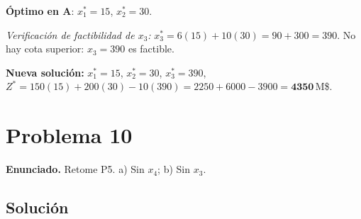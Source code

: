 \documentclass{article}
\begin{document}
\textbf{Óptimo en A}: $x_1^*=15$, $x_2^*=30$.

\textit{Verificación de factibilidad de $x_3$:} $x_3^*=6(15)+10(30)=90+300=390$. No hay cota superior: $x_3=390$ es factible. \checkmark

\textbf{Nueva solución:} $x_1^*=15$, $x_2^*=30$, $x_3^*=390$, $Z^*=150(15)+200(30)-10(390)=2250+6000-3900=\mathbf{4350}$\,M\$.

\newpage
\section*{Problema 10}

\textbf{Enunciado.} Retome P5. a) Sin $x_4$; b) Sin $x_3$.

\subsection*{Solución}
\end{document}
